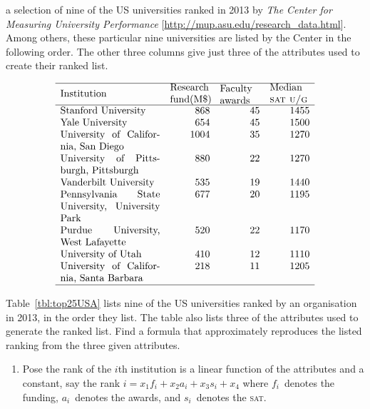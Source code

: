 \begin{exercise} \label{ex:top25USA} 
\begin{table}
\caption{a selection of nine of the US universities ranked in 2013 by \emph{The Center for Measuring University Performance} [\url{http://mup.asu.edu/research_data.html}].  
Among others, these particular nine universities are listed by the Center in the following order.  
The other three columns give just three of the attributes used to create their ranked list.}
\label{tbl:top25USA}
\begin{equation*}
\begin{array}{p{10em}rrr}
\hline
Institution& 
\parbox{4em}{\raggedright Research fund(M\$)}& 
\parbox{4em}{\raggedright Faculty awards} & 
\parbox{4em}{\raggedright Median \textsc{sat u/g}}\\
\hline
Stanford University&868&45&1455\\
Yale University&654&45&1500\\
University of California, San Diego&1004&35&1270\\
University of Pittsburgh, Pittsburgh&880&22&1270\\
Vanderbilt University&535&19&1440\\
Pennsylvania State University, University Park&677&20&1195\\
Purdue University, West Lafayette&520&22&1170\\
University of Utah&410&12&1110\\
University of California, Santa Barbara&218&11&1205\\
\hline
\end{array}
\end{equation*}
\end{table}%
Table~\ref{tbl:top25USA} lists nine of the US universities ranked by an organisation in 2013, in the order they list.
The table also lists three of the attributes used to generate the ranked list.
Find a formula that approximately reproduces the listed ranking from the three given attributes.
\begin{enumerate}
\item Pose the rank of the \(i\)th institution is a linear function of the attributes and a constant, say the rank \(i=x_1f_i+x_2a_i+x_3s_i+x_4\) where \(f_i\)~denotes the funding, \(a_i\)~denotes the awards, and \(s_i\)~denotes the \textsc{sat}.

\end{enumerate}
\end{exercise}
